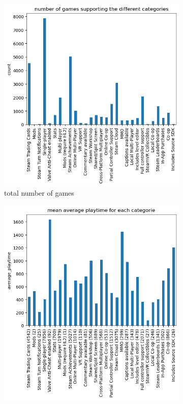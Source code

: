 \documentclass[11pt]{article}
\begin{document}
  \begin{figure}[h]
    \centering
    \begin{subfigure}[h]{0.49\textwidth}
        \centering
        \includegraphics[width=\textwidth]{graphics/insight3_graph3.png}
        \caption{total number of games}
        \label{fig:insight3_3}
    \end{subfigure}
    \hfill
    \begin{subfigure}[h]{0.49\textwidth}
        \centering
        \includegraphics[width=\textwidth]{graphics/insight3_graph4.png}

\end{subfigure}
\end{figure}
\end{document}
